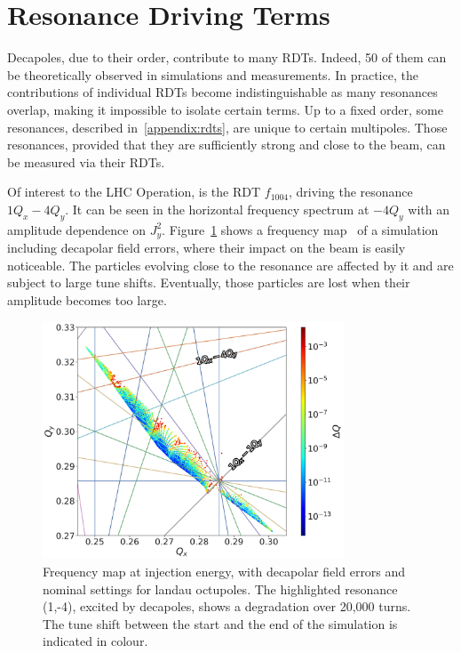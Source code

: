 \section{Resonance Driving Terms}

Decapoles, due to their order, contribute to many RDTs. Indeed, 50 of them can be theoretically 
observed in simulations and measurements. In practice, the contributions of individual RDTs
become indistinguishable as many resonances overlap, making it impossible to isolate certain terms.
Up to a fixed order, some resonances, described in~\cref{appendix:rdts}, are unique to
certain multipoles. Those resonances, provided that they are sufficiently strong and close to the
beam, can be measured via their RDTs.

Of interest to the LHC Operation, is the RDT $f_{1004}$, driving the resonance $1Q_x - 4Q_y$.
It can be seen in the horizontal frequency spectrum at $-4Q_y$ with an amplitude dependence on
$J_y^2$. 
Figure~\cref{fig:decapoles:rdts:tune_diagram} shows a frequency
map~\cite{yannis_papaphilippou_detecting_nodate} of a simulation including decapolar field errors,
where their impact on the beam is easily noticeable. The  particles evolving close to the
resonance are affected by it and are subject to large tune shifts. Eventually, those particles are 
lost when their amplitude becomes too large.

\begin{figure}[H]
    \centering
    \includegraphics[width=0.8\textwidth]{./images/tune_diagram_f1004.pdf}
    \caption{Frequency map at injection energy, with decapolar field errors and nominal settings for
    landau octupoles. The highlighted resonance (1,-4), excited by decapoles, shows a degradation
    over 20,000 turns. The tune shift between the start and the end of the simulation is indicated
    in colour. }
    \label{fig:decapoles:rdts:tune_diagram}
\end{figure}

